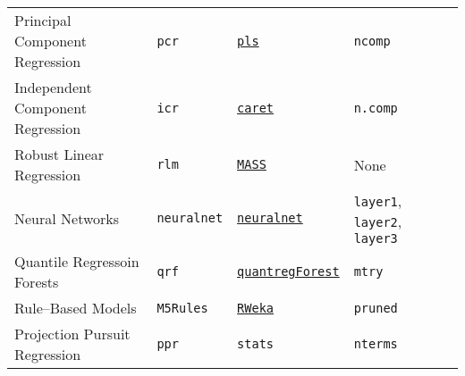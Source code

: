 \documentclass[12pt]{article}
\begin{document}
\begin{landscape}
\begin{longtable}{lllll}
       Principal Component Regression&
         \texttt{pcr} & 
             {\tt \href{http://cran.r-project.org/web/packages/pls/index.html}{pls}}      & 
            \texttt{ncomp}  & \\  

\rowcolor[rgb]{.95, .95, .95}   
       Independent Component Regression&
         \texttt{icr} & 
             {\tt \href{http://cran.r-project.org/web/packages/caret/index.html}{caret}}      & 
            \texttt{n.comp} & \\              
           
                
      Robust Linear Regression &
         \texttt{rlm} & 
             {\tt \href{http://cran.r-project.org/web/packages/MASS/index.html}{MASS}}       & 
            None & \\              
            
\rowcolor[rgb]{.95, .95, .95}              
      Neural Networks &
         \texttt{neuralnet} & 
             {\tt \href{http://cran.r-project.org/web/packages/neuralnet/index.html}{neuralnet}}       & 
            \texttt{layer1},  \texttt{layer2}, \texttt{layer3} & \\         
              
      Quantile Regressoin Forests &
         \texttt{qrf} & 
             {\tt \href{http://cran.r-project.org/web/packages/quantregForest/index.html}{quantregForest}}       & 
            \texttt{mtry} & \\                 
                   
 \rowcolor[rgb]{.95, .95, .95}   
      Rule--Based Models &
         \texttt{M5Rules} & 
            {\tt \href{http://cran.r-project.org/web/packages/RWeka/index.html}{RWeka}}    & 
            \texttt{pruned}  & \\             


      Projection Pursuit Regression  &
         \texttt{ppr} & 
            \texttt{stats}       & 
            \texttt{nterms} & \\            
         

\end{longtable}
\end{landscape}
\end{document}

